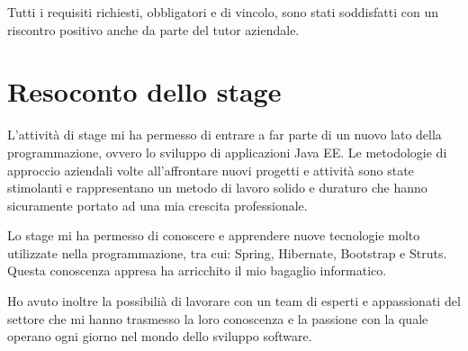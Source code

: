 \noindent Tutti i requisiti richiesti, obbligatori e di vincolo, sono stati soddisfatti con un riscontro positivo anche da parte del tutor aziendale. 

\pagebreak

\section{Resoconto dello stage}
L'attività di stage mi ha permesso di entrare a far parte di un nuovo lato della programmazione, ovvero lo sviluppo di applicazioni Java EE. Le metodologie di approccio aziendali volte all'affrontare nuovi progetti e attività sono state stimolanti e rappresentano un metodo di lavoro solido e duraturo che hanno sicuramente portato ad una mia crescita professionale. 

\setlength{\parskip}{3ex}

\noindent Lo stage mi ha permesso di conoscere e apprendere nuove tecnologie molto utilizzate nella programmazione, tra cui: Spring, Hibernate, Bootstrap e Struts. Questa conoscenza appresa ha arricchito il mio bagaglio informatico.

\setlength{\parskip}{3ex}

\noindent Ho avuto inoltre la possibilià di lavorare con un team di esperti e appassionati del settore che mi hanno trasmesso la loro conoscenza e la passione con la quale operano ogni giorno nel mondo dello sviluppo software.